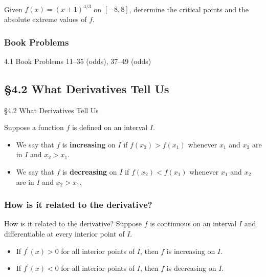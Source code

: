 \documentclass[cal1spr16Lectures.tex]{subfiles}
\begin{document}
\begin{frame}%
\frametitle{}
\begin{exe} Given $f(x)=(x+1)^{4/3}$ on $[-8,8]$, determine the critical points and the absolute extreme values of $f$. \end{exe}
\end{frame}

\subsubsection{Book Problems}

\begin{frame}
\begin{block}{4.1 Book Problems}
11--35 (odds), 37--49 (odds) 
\end{block}
\end{frame}

\subsection[4.2 What Derivatives Tell Us]{\S 4.2 What Derivatives Tell Us}

\begin{frame}{\S 4.2 What Derivatives Tell Us}
\begin{dfn} Suppose a function $f$ is defined on an interval $I$.
\begin{itemize}
\item We say that $f$ is {\bf increasing} on $I$ if $f(x_2)>f(x_1)$ whenever $x_1$ and $x_2$ are in $I$ and $x_2 > x_1$.
\item We say that $f$ is {\bf decreasing} on $I$ if $f(x_2)<f(x_1)$ whenever $x_1$ and $x_2$ are in $I$ and $x_2 > x_1$.
\end{itemize}
\end{dfn}
\end{frame}

\subsubsection{How is it related to the derivative?}

\begin{frame}{\small How is it related to the derivative?}
Suppose $f$ is continuous on an interval $I$ and differentiable at every interior point of $I$.

\vspace{1pc}
\begin{itemize}
\item If \alert{$f^{\prime}(x)>0$} for all interior points of $I$, then $f$ is \alert{increasing} on $I$.

\vspace{1pc}
\item If \alert{$f^{\prime}(x)<0$} for all interior points of $I$, then $f$ is \alert{decreasing} on $I$.
\end{itemize}
\end{frame}
\end{document}
